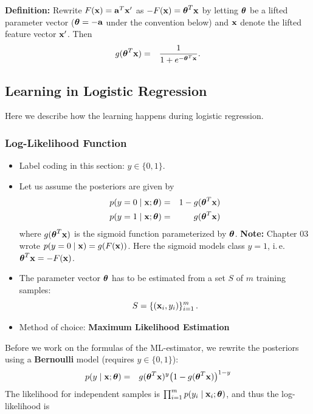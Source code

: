   \textbf{Definition:} Rewrite $F(\bm{\mathrm{x}})=\bm{\mathrm{a}}^T\bm{\mathrm{x}}'$ as $-F(\bm{\mathrm{x}})=\bm{\mathrm{\theta}}^T\bm{\mathrm{x}}$ by letting $\bm{\mathrm{\theta}}$ be a lifted parameter vector ($\bm{\mathrm{\theta}}=-\bm{\mathrm{a}}$ under the convention below) and $\bm{\mathrm{x}}$ denote the lifted feature vector $\bm{\mathrm{x}}'$. Then
    \begin{eqnarray*}
      g(\bm{\mathrm{\theta}}^T \bm{\mathrm{x}}) &=& \frac{1}{1+e^{-\bm{\mathrm{\theta}}^T \bm{\mathrm{x}}}}.
    \end{eqnarray*}
\subsection{Learning in Logistic Regression}\label{sec:lr_learning}
Here we describe how the learning happens during logistic regression. 

\subsubsection{Log-Likelihood Function}
   \begin{itemize}
    \item Label coding in this section: $y\in\{0,1\}$.
    \item Let us assume the posteriors are given by
      \begin{eqnarray*}
        p(y=0\mid\bm{\mathrm{x}};\bm{\mathrm{\theta}}) &=&  1-g(\bm{\mathrm{\theta}}^T\bm{\mathrm{x}}) \\
        p(y=1\mid\bm{\mathrm{x}};\bm{\mathrm{\theta}}) &=&  g(\bm{\mathrm{\theta}}^T\bm{\mathrm{x}})
      \end{eqnarray*}
      where $g(\bm{\mathrm{\theta}}^T\bm{\mathrm{x}})$ is the sigmoid function parameterized by $\bm{\mathrm{\theta}}$. 
      \textbf{Note:} Chapter 03 wrote $p(y=0\mid\bm{\mathrm{x}})=g(F(\bm{\mathrm{x}}))$. Here the sigmoid models class $y=1$, i.\,e.\ $\bm{\mathrm{\theta}}^T\bm{\mathrm{x}}=-F(\bm{\mathrm{x}})$.
    \item The parameter vector $\bm{\mathrm{\theta}}$ has to be estimated from a set $S$ of $m$ training samples:
      \begin{displaymath}
        S = \{(\bm{\mathrm{x}}_i, y_i)\}_{i=1}^m\,.
      \end{displaymath}
    \item Method of choice: \textbf{Maximum Likelihood Estimation}
  \end{itemize}

Before we work on the formulas of the ML-estimator, we rewrite the posteriors using a \textbf{Bernoulli} model (requires $y\in\{0,1\}$):
  \begin{eqnarray*}
    p(y\mid\bm{\mathrm{x}};\bm{\mathrm{\theta}}) &=&  g(\bm{\mathrm{\theta}}^T\bm{\mathrm{x}})^{y}\big(1-g(\bm{\mathrm{\theta}}^T\bm{\mathrm{x}})\big)^{1-y}
  \end{eqnarray*}
  The likelihood for independent samples is $\prod_{i=1}^m p(y_i\mid\bm{\mathrm{x}}_i;\bm{\mathrm{\theta}})$, and thus the log-likelihood is
 
